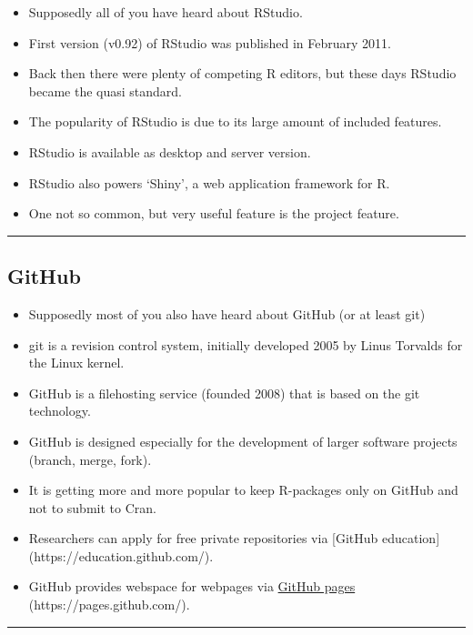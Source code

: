 \begin{itemize}
\item
  Supposedly all of you have heard about RStudio.
\item
  First version (v0.92) of RStudio was published in February 2011.
\item
  Back then there were plenty of competing R editors, but these days
  RStudio became the quasi standard.
\item
  The popularity of RStudio is due to its large amount of included
  features.
\item
  RStudio is available as desktop and server version.
\item
  RStudio also powers `Shiny', a web application framework for R.
\item
  One not so common, but very useful feature is the project feature.
\end{itemize}

\begin{center}\rule{0.5\linewidth}{\linethickness}\end{center}

\subsection{GitHub}\label{github}

\begin{itemize}
\item
  Supposedly most of you also have heard about GitHub (or at least git)
\item
  git is a revision control system, initially developed 2005 by Linus
  Torvalds for the Linux kernel.
\item
  GitHub is a filehosting service (founded 2008) that is based on the
  git technology.
\item
  GitHub is designed especially for the development of larger software
  projects (branch, merge, fork).
\item
  It is getting more and more popular to keep R-packages only on GitHub
  and not to submit to Cran.
\item
  Researchers can apply for free private repositories via {[}GitHub
  education{]} (https://education.github.com/).
\item
  GitHub provides webspace for webpages via
  \hyperref[github-pages]{GitHub pages} (https://pages.github.com/).
\end{itemize}

\begin{center}\rule{0.5\linewidth}{\linethickness}\end{center}

